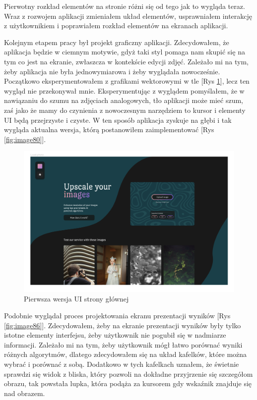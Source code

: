 Pierwotny rozkład elementów na stronie różni się od tego jak to wygląda teraz. Wraz z rozwojem aplikacji zmieniałem układ elementów, usprawniałem interakcję z użytkownikiem i poprawiałem rozkład elementów na ekranach aplikacji.

Kolejnym etapem pracy był projekt graficzny aplikacji. Zdecydowałem, że aplikacja będzie w ciemnym motywie, gdyż taki styl pomaga nam skupić się na tym co jest na ekranie, zwłaszcza w kontekście edycji zdjęć. Zależało mi na tym, żeby aplikacja nie była jednowymiarowa i żeby wyglądała nowocześnie. Początkowo eksperymentowałem z grafikami wektorowymi w tle [Rys \ref{fig:image85}], lecz ten wygląd nie przekonywał mnie. Eksperymentując z wyglądem pomyślałem, że w nawiązaniu do szumu na zdjęciach analogowych, tło aplikacji może mieć szum, zaś jako że mamy do czynienia z nowoczesnym narzędziem to kursor i elementy UI będą przejrzyste i czyste. W ten sposób aplikacja zyskuje na głębi i tak wygląda aktualna wersja, którą postanowiłem zaimplementować [Rys \ref{fig:image80}].
\begin{figure}[ht]
    \centering
    \begin{minipage}[t]{0.8\linewidth}
        \includegraphics[width=\linewidth]{Rozdziały/06.Aplikacja/Obrazy/UI 1.png}  
        \caption{Pierwsza wersja UI strony głównej}
        \label{fig:image85}
    \end{minipage}
\end{figure}

Podobnie wyglądał proces projektowania ekranu prezentacji wyników [Rys \ref{fig:image86}]. Zdecydowałem, żeby na ekranie prezentacji wyników były tylko istotne elementy interfejsu, żeby użytkownik nie pogubił się w nadmiarze informacji. Zależało mi na tym, żeby użytkownik mógł łatwo porównać wyniki różnych algorytmów, dlatego zdecydowałem się na układ kafelków, które można wybrać i porównać z sobą. Dodatkowo w tych kafelkach uznałem, że świetnie sprawdzi się widok z bliska, który pozwoli na dokładne przyjrzenie się szczegółom obrazu, tak powstała lupka, która podąża za kursorem gdy wskaźnik znajduje się nad obrazem. 


